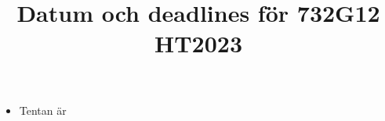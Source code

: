 \documentclass[a4paper]{article}
\title{Datum och deadlines för 732G12 HT2023}
\author{}
\date{}
\begin{document}
\maketitle
\thispagestyle{fancy}

\begin{itemize}
    \item Tentan är 
\end{itemize}
\end{document}
